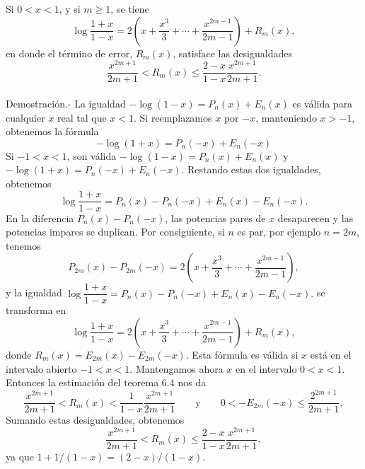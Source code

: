 \begin{teo}
    Si $0<x<1$, y si $m\geq 1$, se tiene
    $$\log\dfrac{1+x}{1-x}=2\left(x+\dfrac{x^3}{3}+\cdots + \dfrac{x^{2m-1}}{2m-1}\right)+R_m(x),$$
    en donde el término de error, $R_m(x)$, satisface las desigualdades
    $$\dfrac{x^{2m+1}}{2m+1}< R_m(x)\leq \dfrac{2-x}{1-x}\dfrac{x^{2m+1}}{2m+1}.$$\\
	Demostración.-\; La igualdad $-\log(1-x)=P_n(x)+E_n(x)$ es válida para cualquier $x$ real tal que $x<1$. Si reemplazamos $x$ por $-x$, manteniendo $x>-1$, obtenemos la fórmula
	$$-\log(1+x)=P_n(-x)+E_n(-x)$$
	Si $-1<x<1$, son válida $-\log(1-x)=P_n(x)+E_n(x)$ y $-\log(1+x)=P_n(-x)+E_n(-x)$. Restando estas dos igualdades, obtenemos
	$$\log \dfrac{1+x}{1-x} = P_n(x)-P_n(-x)+E_n(x)-E_n(-x).$$
	En la diferencia $P_n(x)-P_n(-x)$, las potencias pares de $x$ desaparecen y las potencias impares se duplican. Por consiguiente, si $n$ es par, por ejemplo $n=2m$, tenemos
	$$P_{2m}(x)-P_{2m}(-x) = 2\left(x+\dfrac{x^3}{3}+\cdots+\dfrac{x^{2m-1}}{2m-1}\right),$$
	y la igualdad  $\log \dfrac{1+x}{1-x} = P_n(x)-P_n(-x)+E_n(x)-E_n(-x).$ se transforma en
	$$\log \dfrac{1+x}{1-x} = 2\left(x+\dfrac{x^3}{3}+\cdots+\dfrac{x^{2m-1}}{2m-1}\right)+R_m(x),$$
	donde $R_m(x)=E_{2m}(x)-E_{2m}(-x)$. Esta fórmula es válida si $x$ está en el intervalo abierto $-1<x<1$. Mantengamos ahora $x$ en el intervalo $0<x<1$. Entonces la estimación del teorema 6.4 nos da
	$$\dfrac{x^{2m+1}}{2m+1}<R_m(x)<\dfrac{1}{1-x}\dfrac{x^{2m+1}}{2m+1} \qquad \mbox{y}\qquad 0<-E_{2m}(-x)\leq \dfrac{2^{2m+1}}{2m+1},$$
	Sumando estas desigualdades, obtenemos 
	$$\dfrac{x^{2m+1}}{2m+1}< R_m(x)\leq \dfrac{2-x}{1-x}\dfrac{x^{2m+1}}{2m+1},$$ 
	ya que $1+1/(1 - x) = (2 - x)/(1 - x).$
\end{teo}

